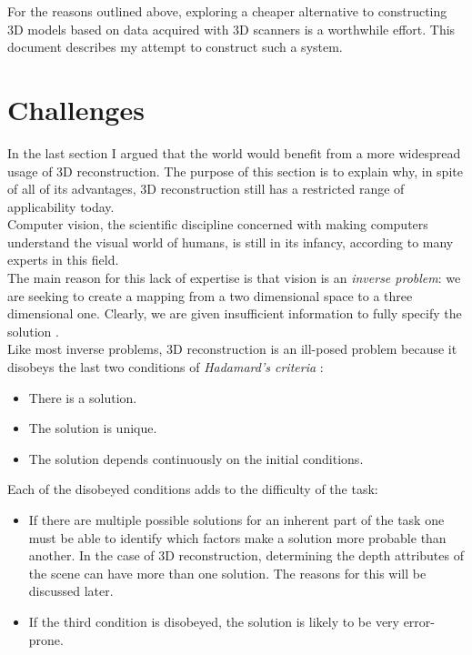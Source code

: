 \documentclass[12pt,a4paper,twoside,openright]{report}
\begin{document}
For the reasons outlined above, exploring a cheaper alternative to constructing 3D models based on data acquired with 3D scanners is a worthwhile effort. This document describes my attempt to construct such a system. 

\section{Challenges}
In the last section I argued that the world would benefit from a more widespread usage of 3D reconstruction. The purpose of this section is to explain why, in spite of all of its advantages, 3D reconstruction still has a restricted range of applicability today. \\
\linebreak
Computer vision, the scientific discipline concerned with making computers understand the visual world of humans, is still in its infancy, according to many experts in this field. \\
The main reason for this lack of expertise is that vision is an \textit{inverse problem}: we are seeking to create a mapping from a two dimensional space to a three dimensional one. Clearly, we are given insufficient information to fully specify the solution \cite{Szeliski+2011}.\\
\linebreak
Like most inverse problems, 3D reconstruction is an ill-posed problem because it disobeys the last two conditions of \textit{Hadamard's criteria} \cite{+2008}:
\begin{itemize}
\item There is a solution.
\item The solution is unique.
\item The solution depends continuously on the initial conditions.
\end{itemize}
Each of the disobeyed conditions adds to the difficulty of the task:\\
\begin{itemize}
\item If there are multiple possible solutions for an inherent part of the task one must be able to identify which factors make a solution more probable than another. In the case of 3D reconstruction, determining the depth attributes of the scene can have more than one solution. The reasons for this will be discussed later.
\item If the third condition is disobeyed, the solution is likely to be very error-prone.
\end{itemize}
\end{document}
